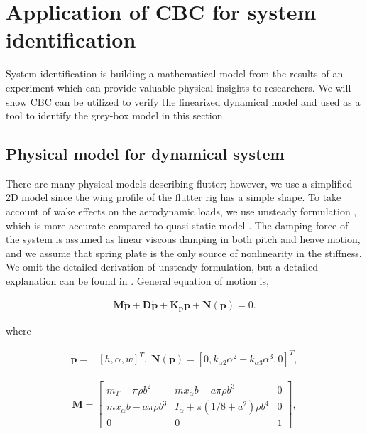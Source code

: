 \documentclass[openacc]{rsproca_new}%
\def\vec#1{\ensuremath{\mathbf{#1}}}
\begin{document}
\section{Application of CBC for system identification}
System identification is building a mathematical model from the results of an experiment which can provide valuable physical insights to researchers. We will show CBC can be utilized to verify the linearized dynamical model and used as a tool to identify the grey-box model \cite{bohlin2006practical} in this section.

\subsection{Physical model for dynamical system}\label{model}
There are many physical models describing flutter; however, we use a simplified 2D model since the wing profile of the flutter rig has a simple shape. To take account of wake effects on the aerodynamic loads, we use unsteady formulation \cite{abdelkefi2013analytical}, which is more accurate compared to quasi-static model \cite{strganac2000identification}. The damping force of the system is assumed as linear viscous damping in both pitch and heave motion, and we assume that spring plate is the only source of nonlinearity in the stiffness. We omit the detailed derivation of unsteady formulation, but a detailed explanation can be found in \cite{abdelkefi2013analytical}. General equation of motion is,

\begin{align}\label{eq:2-1}
\vec{M} \ddot{\vec{p}} + \vec{D} \dot{\vec{p}} +\vec{K_p} \vec{p} + \vec{N}(\vec{p}) =0.
\end{align}

\noindent where

\begin{align}\label{eq:2-2}
\vec{p}=&[h,\alpha,w]^T, \; \vec{N}(\vec{p})=[0,k_{\alpha 2}\alpha^2+k_{\alpha 3}\alpha^3,0]^T,
\end{align}

\begin{align}\label{eq:2-3}
\vec{M}=
\begin{bmatrix}
    m_T+\pi \rho b^2       & m x_\alpha b-a\pi\rho b^3 & 0 \\
    m x_\alpha b-a\pi\rho b^3       & I_\alpha+\pi(1/8+a^2)\rho b^4 & 0 \\
    0       & 0 & 1
\end{bmatrix},
\end{align}
\end{document}

